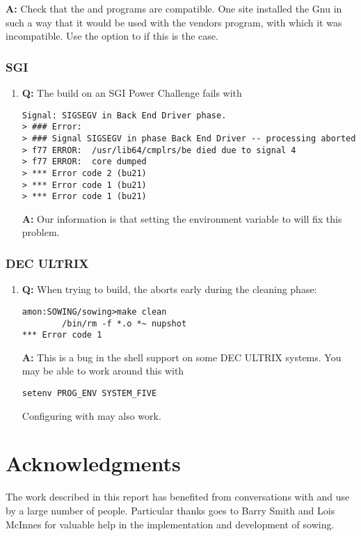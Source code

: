 \documentclass[11pt,twoside]{article}
\def\question{{\bf Q: }}
\def\answer{{\bf A: }}
\begin{document}
\begin{enumerate}
\answer
Check that the  and  programs are compatible.  One site
installed the Gnu  in such a way that it would be used with the
vendors  program, with which it was incompatible.  Use the
 option to  if this is the case.

\end{enumerate}

\subsubsection{SGI}
\begin{enumerate}
\item 
\question 
The build on an SGI Power Challenge fails with 
\begin{verbatim}
Signal: SIGSEGV in Back End Driver phase.
> ### Error:
> ### Signal SIGSEGV in phase Back End Driver -- processing aborted
> f77 ERROR:  /usr/lib64/cmplrs/be died due to signal 4
> f77 ERROR:  core dumped
> *** Error code 2 (bu21)
> *** Error code 1 (bu21)
> *** Error code 1 (bu21)
\end{verbatim}

\answer Our information is that setting the environment variable  to
 will fix this problem.

\end{enumerate}

\subsubsection{DEC ULTRIX}
\begin{enumerate}
\item
\question
When trying to build, the  aborts early during the cleaning phase:
\begin{verbatim}
amon:SOWING/sowing>make clean
        /bin/rm -f *.o *~ nupshot
*** Error code 1
\end{verbatim}

\answer
This is a bug in the shell support on some DEC ULTRIX systems.  You may be
able to work around this with

\begin{verbatim}
setenv PROG_ENV SYSTEM_FIVE
\end{verbatim}
Configuring with  may also work.

\end{enumerate}


\section*{Acknowledgments}

The work described in this report has benefited from conversations with and
use by a large number of people.
Particular thanks goes to Barry Smith and Lois McInnes for valuable help
in the implementation and development of sowing.



\end{document}
